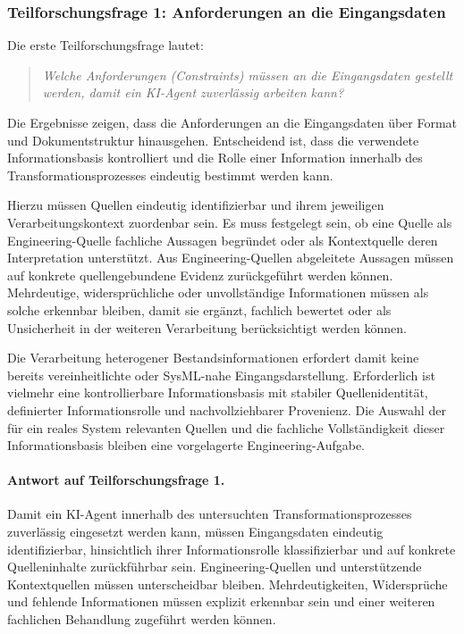 \subsubsection{Teilforschungsfrage 1: Anforderungen an die Eingangsdaten}
\label{sec:discussion_rq1}

Die erste Teilforschungsfrage lautet:

\begin{quote}
\textit{Welche Anforderungen (Constraints) müssen an die Eingangsdaten
gestellt werden, damit ein KI-Agent zuverlässig arbeiten kann?}
\end{quote}

Die Ergebnisse zeigen, dass die Anforderungen an die Eingangsdaten über
Format und Dokumentstruktur hinausgehen. Entscheidend ist, dass die
verwendete Informationsbasis kontrolliert und die Rolle einer Information
innerhalb des Transformationsprozesses eindeutig bestimmt werden kann.

Hierzu müssen Quellen eindeutig identifizierbar und ihrem jeweiligen
Verarbeitungskontext zuordenbar sein. Es muss festgelegt sein, ob eine Quelle
als Engineering-Quelle fachliche Aussagen begründet oder als Kontextquelle
deren Interpretation unterstützt. Aus Engineering-Quellen abgeleitete
Aussagen müssen auf konkrete quellengebundene Evidenz zurückgeführt werden
können. Mehrdeutige, widersprüchliche oder unvollständige Informationen
müssen als solche erkennbar bleiben, damit sie ergänzt, fachlich bewertet
oder als Unsicherheit in der weiteren Verarbeitung berücksichtigt werden
können.

Die Verarbeitung heterogener Bestandsinformationen erfordert damit keine
bereits vereinheitlichte oder SysML-nahe Eingangsdarstellung. Erforderlich
ist vielmehr eine kontrollierbare Informationsbasis mit stabiler
Quellenidentität, definierter Informationsrolle und nachvollziehbarer
Provenienz. Die Auswahl der für ein reales System relevanten Quellen und die
fachliche Vollständigkeit dieser Informationsbasis bleiben eine
vorgelagerte Engineering-Aufgabe.

\paragraph{Antwort auf Teilforschungsfrage 1.}

Damit ein KI-Agent innerhalb des untersuchten Transformationsprozesses
zuverlässig eingesetzt werden kann, müssen Eingangsdaten eindeutig
identifizierbar, hinsichtlich ihrer Informationsrolle klassifizierbar und
auf konkrete Quelleninhalte zurückführbar sein. Engineering-Quellen und
unterstützende Kontextquellen müssen unterscheidbar bleiben.
Mehrdeutigkeiten, Widersprüche und fehlende Informationen müssen explizit
erkennbar sein und einer weiteren fachlichen Behandlung zugeführt werden
können.


